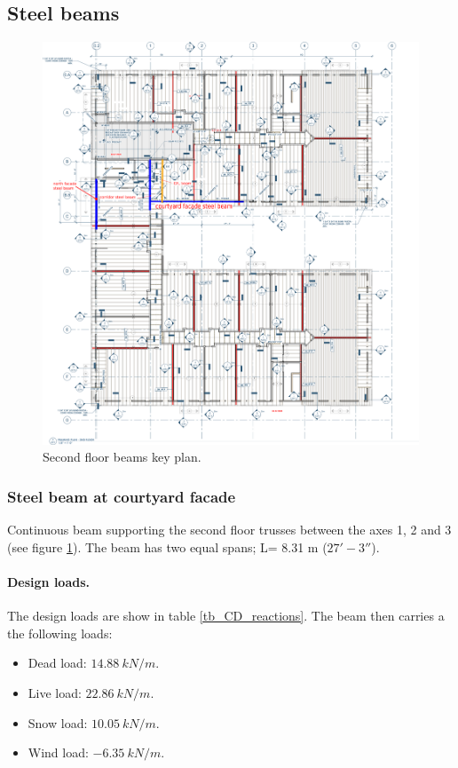 \subsection{Steel beams}

\begin{figure}
  \begin{center}
  \includegraphics[width=120mm]{figures/steel_beams_key_plan}
  \end{center}
  \caption{Second floor beams key plan.}\label{fg_2nd_floor_beams_key_plan}
\end{figure}

\subsubsection{Steel beam at courtyard facade}
Continuous beam supporting the second floor trusses between the axes 1, 2 and 3 (see figure \ref{fg_2nd_floor_beams_key_plan}). The beam has two equal spans; L= 8.31 m ($27' - 3''$).

\paragraph{Design loads.}
The design loads are show in table \ref{tb_CD_reactions}. The beam then carries a the following loads:\\
\begin{itemize}
\item Dead load: $14.88\ kN/m$.
\item Live load: $22.86\ kN/m$.
\item Snow load: $10.05\ kN/m$.
\item Wind load: $-6.35\ kN/m$.
\end{itemize}

